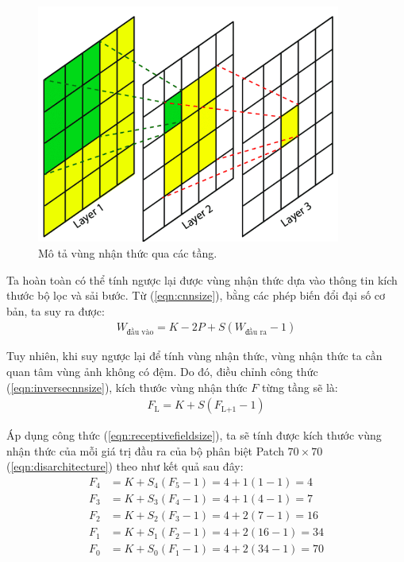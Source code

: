 \documentclass[a4paper, 12pt]{report}
\begin{document}
\begin{figure}[!h]
\captionsetup{width=0.8\textwidth}
\centering
\includegraphics[width=10cm]{images/3_3.png}
\caption{Mô tả vùng nhận thức qua các tầng.}
\label{fig:receptivefield}
\end{figure}

Ta hoàn toàn có thể tính ngược lại được vùng nhận thức dựa vào thông tin kích thước bộ lọc và sải bước.
Từ (\ref{eqn:cnnsize}), bằng các phép biến đổi đại số cơ bản, ta suy ra được:
\begin{align}
    W_{\text{đầu vào}} = K - 2P + S\left(W_{\text{đầu ra}} - 1\right)\label{eqn:inversecnnsize}
\end{align}

Tuy nhiên, khi suy ngược lại để tính vùng nhận thức, vùng nhận thức ta cần quan tâm vùng ảnh không có đệm.
Do đó, điều chỉnh công thức (\ref{eqn:inversecnnsize}), kích thước vùng nhận thức $F$ từng tầng sẽ là:
\begin{align}
    F_{\text{L}} = K + S\left(F_{\text{L+1}} - 1\right)\label{eqn:receptivefieldsize}
\end{align}

Áp dụng công thức (\ref{eqn:receptivefieldsize}), ta sẽ tính được kích thước vùng nhận thức của mỗi giá trị đầu ra của bộ phân biệt Patch $70 \times 70$ (\ref{eqn:disarchitecture}) theo như kết quả sau đây:
\begin{align*}
    F_4 &= K + S_4(F_5 - 1) = 4 + 1(1-1) = 4\\
    F_3 &= K + S_3(F_4 - 1) = 4 + 1(4-1) = 7\\
    F_2 &= K + S_2(F_3 - 1) = 4 + 2(7-1) = 16\\
    F_1 &= K + S_1(F_2 - 1) = 4 + 2(16-1) = 34\\
    F_0 &= K + S_0(F_1 - 1) = 4 + 2(34 - 1) = 70
\end{align*}
\end{document}
